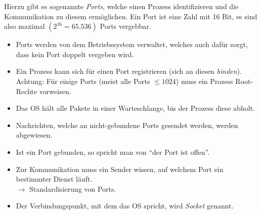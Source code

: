		Hierzu gibt es sogenannte \textit{Ports}, welche einen Prozess identifizieren und die Kommunikation zu diesem ermöglichen. Ein Port ist eine Zahl mit 16 Bit, es sind also maximal \(( 2 ^ {16} = 65.536 )\) Ports vergebbar.


		\begin{itemize}
			\item Ports werden von dem Betriebssystem verwaltet, welches auch dafür sorgt, dass kein Port doppelt vergeben wird.
			\item Ein Prozess kann sich für einen Port registrieren (sich an diesen \textit{binden}). \\ Achtung: Für einige Ports (meist alle Ports \( \leq 1024 \)) muss ein Prozess Root-Rechte vorweisen.
			\item Das OS hält alle Pakete in einer Warteschlange, bis der Prozess diese abholt.
			\item Nachrichten, welche an nicht-gebundene Ports gesendet werden, werden abgewiesen.
			\item Ist ein Port gebunden, so spricht man von \enquote{der Port ist offen}.
			\item Zur Kommunikation muss ein Sender wissen, auf welchem Port ein bestimmter Dienst läuft. \\ \( \rightarrow \) Standardisierung von Ports.
			\item Der Verbindungspunkt, mit dem das OS spricht, wird \textit{Socket} genannt.
		\end{itemize}

